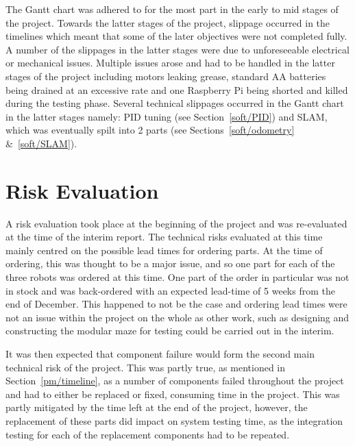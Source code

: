 The Gantt chart was adhered to for the most part in the early to 
mid stages of the project. Towards the latter stages of the 
project, slippage occurred in the timelines which meant that some 
of the later objectives were not completed fully. A number 
of the slippages in the latter stages were due to unforeseeable 
electrical or mechanical issues. Multiple issues arose and had to 
be handled in the latter stages of the project including motors 
leaking grease, standard AA batteries being drained at an 
excessive rate and one Raspberry Pi being shorted and killed 
during the testing phase. Several technical slippages occurred in the Gantt 
chart in the latter stages namely: PID tuning (see Section~\ref{soft/PID}) and SLAM, which was eventually spilt into 2 parts (see Sections~\ref{soft/odometry} \&~\ref{soft/SLAM}).

\section{Risk Evaluation}\label{pm/riskeval}
A risk evaluation took place at the beginning of the project and 
was re-evaluated at the time of the interim report. The technical 
risks evaluated at this time mainly centred on the possible lead 
times for ordering parts. At the time of ordering, this was 
thought to be a major issue, and so one part for each of the three 
robots was ordered at this time. One part of the order in 
particular was not in stock and was back-ordered with an expected 
lead-time of 5 weeks from the end of December. This happened to 
not be the case and ordering lead times were not an issue within 
the project on the whole as other work, such as designing and 
constructing the modular maze for testing could be carried out in 
the interim. 

It was then expected that component failure would form the second 
main technical risk of the project. This was partly true, as 
mentioned in Section~\ref{pm/timeline}, as a number of components 
failed throughout the project and had to either be replaced or 
fixed, consuming time in the project. This was partly mitigated by 
the time left at the end of the project, however, the replacement 
of these parts did impact on system testing time, as the 
integration testing for each of the replacement components had to 
be repeated. 


